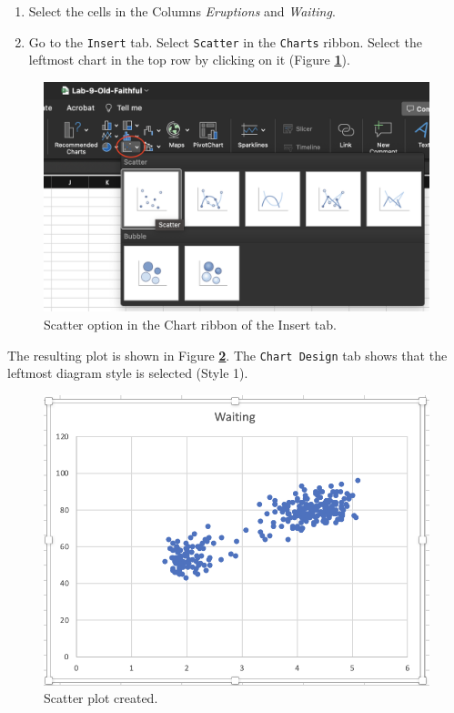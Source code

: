\documentclass[
  12pt,
  letterpaper,
]{book}
\providecommand{\tightlist}{%
  \setlength{\itemsep}{0pt}\setlength{\parskip}{0pt}}
\begin{document}
\begin{enumerate}
\def\labelenumi{\arabic{enumi}.}
\tightlist
\item
  Select the cells in the Columns \emph{Eruptions} and \emph{Waiting}.
\item
  Go to the \texttt{Insert} tab. Select \texttt{Scatter} in the \texttt{Charts} ribbon. Select the leftmost chart in the top row by clicking on it (Figure \textbf{\ref{fig:scatter-plot}}).
\end{enumerate}

\begin{figure}

{\centering \includegraphics[width=0.65\linewidth]{images/scatter-plot} 

}

\caption{ Scatter option in the Chart ribbon of the Insert tab.}\label{fig:scatter-plot}
\end{figure}

The resulting plot is shown in Figure \textbf{\ref{fig:resulting-scatter-plot}}. The \texttt{Chart\ Design} tab shows that the leftmost diagram style is selected (Style 1).

\begin{figure}

{\centering \includegraphics[width=0.65\linewidth]{images/resulting-scatter-plot} 

}

\caption{ Scatter plot created.}\label{fig:resulting-scatter-plot}
\end{figure}
\end{document}
